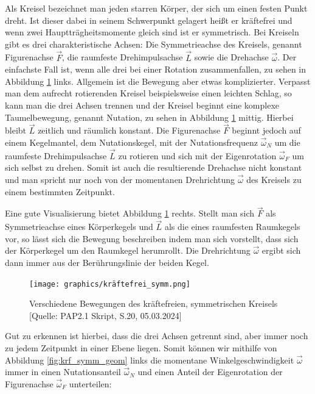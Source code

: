 \documentclass{article}
\begin{document}
Als Kreisel bezeichnet man jeden starren Körper, der sich um einen festen Punkt dreht. Ist dieser dabei in seinem Schwerpunkt gelagert heißt er kräftefrei und wenn zwei Hauptträgheitsmomente gleich sind ist er symmetrisch. Bei Kreiseln gibt es drei charakteristische Achsen: Die Symmetrieachse des Kreisels, genannt Figurenachse $\Vec{F}$, die raumfeste Drehimpulsachse $\Vec{L}$ sowie die Drehachse $\Vec{\omega}$. Der einfachste Fall ist, wenn alle drei bei einer Rotation zusammenfallen, zu sehen in Abbildung \ref{fig:kräftefrei_symm_bew} links. Allgemein ist die Bewegung aber etwas komplizierter. Verpasst man dem aufrecht rotierenden Kreisel beispielsweise einen leichten Schlag, so kann man die drei Achsen trennen und der Kreisel beginnt eine komplexe Taumelbewegung, genannt Nutation, zu sehen in Abbildung \ref{fig:kräftefrei_symm_bew} mittig. Hierbei bleibt $\Vec{L}$ zeitlich und räumlich konstant. Die Figurenachse $\Vec{F}$ beginnt jedoch auf einem Kegelmantel, dem Nutationskegel, mit der Nutationsfrequenz $\Vec{\omega}_N$ um die raumfeste Drehimpulsachse $\Vec{L}$ zu rotieren und sich mit der Eigenrotation $\Vec{\omega}_F$ um sich selbst zu drehen. Somit ist auch die resultierende Drehachse nicht konstant und man spricht nur noch von der momentanen Drehrichtung $\Vec{\omega}$ des Kreisels zu einem bestimmten Zeitpunkt.

Eine gute Visualisierung bietet Abbildung \ref{fig:kräftefrei_symm_bew} rechts. Stellt man sich $\Vec{F}$ als Symmetrieachse eines Körperkegels und $\Vec{L}$ als die eines raumfesten Raumkegels vor, so lässt sich die Bewegung beschreiben indem man sich vorstellt, dass sich der Körperkegel um den Raumkegel herumrollt. Die Drehrichtung $\Vec{\omega}$ ergibt sich dann immer aus der Berührungslinie der beiden Kegel. 

\begin{figure}[!h]
    \centering
    \texttt{[image: graphics/kräftefrei\_symm.png]}
    \caption{Verschiedene Bewegungen des kräftefreien, symmetrischen Kreisels [Quelle: PAP2.1 Skript, S.20, 05.03.2024]}
    \label{fig:kräftefrei_symm_bew}
\end{figure}

\newpage

Gut zu erkennen ist hierbei, dass die drei Achsen getrennt sind, aber immer noch zu jedem Zeitpunkt in einer Ebene liegen. Somit können wir mithilfe von Abbildung \ref{fig:krf_symm_geom} links die momentane Winkelgeschwindigkeit $\Vec{\omega}$ immer in einen Nutationsanteil $\Vec{\omega}_N$ und einen Anteil der Eigenrotation der Figurenachse $\Vec{\omega}_F$ unterteilen: 
\end{document}
